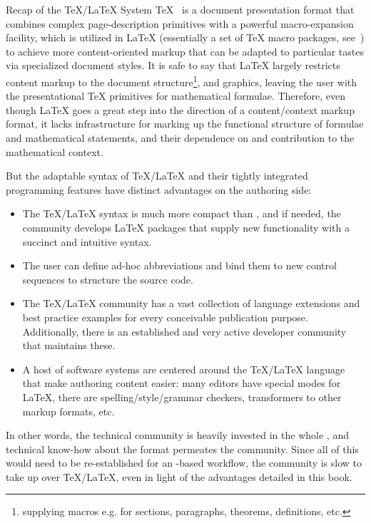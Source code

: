 \begin{tsubsection}{Recap of the {\TeX/\LaTeX} System}
{\TeX}~\cite{Knuth:ttb84} is a document presentation format that combines complex
page-description primitives with a powerful macro-expansion facility, which is utilized in
{\LaTeX} (essentially a set of {\TeX} macro packages, see~\cite{Lamport:ladps94}) to
achieve more content-oriented markup that can be adapted to particular tastes via
specialized document styles. It is safe to say that {\LaTeX} largely restricts content
markup to the document structure\footnote{supplying macros e.g. for sections, paragraphs,
  theorems, definitions, etc.}, and graphics, leaving the user with the presentational
{\TeX} primitives for mathematical formulae. Therefore, even though {\LaTeX} goes a great
step into the direction of a content/context markup format, it lacks infrastructure for
marking up the functional structure of formulae and mathematical statements, and their
dependence on and contribution to the mathematical context.
 
But the adaptable syntax of {\TeX/\LaTeX} and their tightly integrated programming
features have distinct advantages on the authoring side:
\begin{itemize}
\item The {\TeX/\LaTeX} syntax is much more compact than {\omdoc}, and if needed, the
  community develops {\LaTeX} packages that supply new functionality with a succinct and
  intuitive syntax.
\item The user can define ad-hoc abbreviations and bind them to new control sequences to
  structure the source code.
\item The {\TeX/\LaTeX} community has a vast collection of language extensions and best
  practice examples for every conceivable publication purpose. Additionally, there is an
  established and very active developer community that maintains these.
\item A host of software systems are centered around the {\TeX/\LaTeX} language that make
  authoring content easier: many editors have special modes for {\LaTeX}, there are
  spelling/style/grammar checkers, transformers to other markup formats, etc.
\end{itemize}
 
In other words, the technical community is heavily invested in the whole
{}, and technical know-how about the format permeates the
community. Since all of this would need to be re-established for an {\omdoc}-based
workflow, the community is slow to take up {\omdoc} over {\TeX/\LaTeX}, even in light of
the advantages detailed in this book.
\end{tsubsection} 


